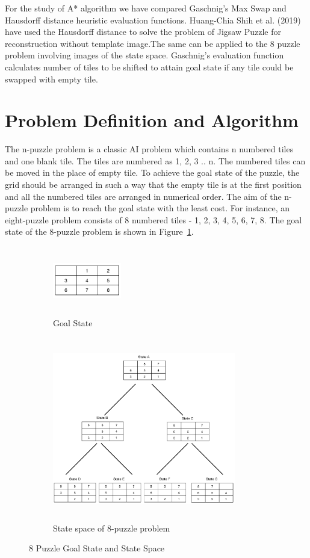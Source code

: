 \documentclass{svproc}
\begin{document}
\noindent For the study of A* algorithm we have compared Gaschnig’s Max Swap and Hausdorff distance heuristic evaluation functions. Huang-Chia Shih et al. (2019) have used the Hausdorff distance to solve the problem of Jigsaw Puzzle for reconstruction without template image.The same can be applied to the 8 puzzle problem involving images of the state space. Gaschnig's evaluation function calculates number of tiles to be shifted to attain goal state if any tile could be swapped with empty tile.

\section{Problem Definition and Algorithm}
\noindent The n-puzzle problem is a classic AI problem which contains n numbered tiles and one blank tile. The tiles are numbered as 1, 2, 3 .. n. The numbered tiles can be moved in the place of empty tile. To achieve the goal state of the puzzle, the grid should be arranged in such a way that the empty tile is at the first position and all the numbered tiles are arranged in numerical order. The aim of the n-puzzle problem is to reach the goal state with the least cost. For instance, an eight-puzzle problem consists of 8 numbered tiles - 1, 2, 3, 4, 5, 6, 7, 8. The goal state of the 8-puzzle problem is shown in Figure~\ref{fig:1a}. \\

\begin{figure}
	\centering
	\begin{subfigure}[b]{0.25\textwidth}
		\centering
		\includegraphics[width=3cm,height=3cm,keepaspectratio]{GoalState.png}
		\caption{Goal State}
		\label{fig:1a}		
	\end{subfigure}
	\begin{subfigure}[b]{0.6\textwidth}
		\centering
		\includegraphics[width=8cm,height=8cm,keepaspectratio]{ExampleState.png}
		\caption{State space of 8-puzzle problem}
		\label{fig:1b}
	\end{subfigure}
	\caption{8 Puzzle Goal State and State Space}
	\label{fig:1}
\end{figure}
\end{document}
